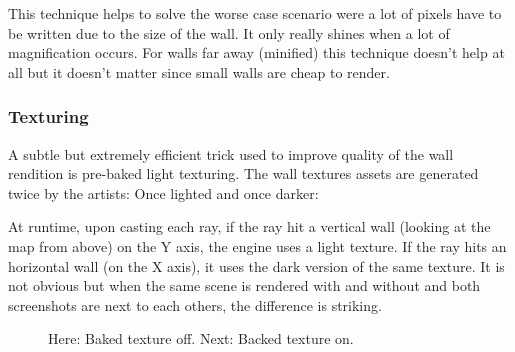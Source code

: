 \begin{minipage}{\textwidth}
 \centering
 \vspace*{0.5cm}
\end{minipage}
This technique helps to solve the worse case scenario were a lot of pixels have to be written due to the size of the wall. It only really shines when a lot of magnification occurs. For walls far away (minified) this technique doesn't help at all but it doesn't matter since small walls are cheap to render.\\






















\subsubsection{Texturing}
A subtle but extremely efficient trick used to improve quality of the wall rendition is pre-baked light texturing. The wall textures assets are generated twice by the artists: Once lighted and once darker:\\
  \begin{figure}[H]
\centering
 \end{figure}
\par
  \begin{figure}[H]
\centering
 \end{figure}
\par
At runtime, upon casting each ray, if the ray hit a vertical wall (looking at the map from above) on the Y axis, the engine uses a light texture. If the ray hits an horizontal wall (on the X axis), it uses the dark version of the same texture. It is not obvious but when the same scene is rendered with and without and both screenshots are next to each others, the difference is striking.\\
\begin{minipage}{\textwidth}
\begin{figure}[H]
\centering
 \caption{Here: Baked texture off. Next: Backed texture on.}
 \end{figure}

\begin{figure}[H]
\centering
 
 \end{figure}
 \end{minipage}


